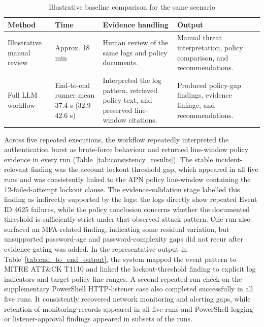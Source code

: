 \documentclass[conference]{IEEEtran}
\begin{document}
\begin{table}[t]
\centering
\caption{Illustrative baseline comparison for the same scenario}
\scriptsize
\setlength{\tabcolsep}{3pt}
\begin{tabular}{|p{}|p{}|p{}|p{}|}
\hline
\textbf{Method} & \textbf{Time} & \textbf{Evidence handling} & \textbf{Output} \\
\hline
Illustrative manual review & Approx. 18 min & Human review of the same logs and policy documents. & Manual threat interpretation, policy comparison, and recommendations. \\
\hline
Full LLM workflow & End-to-end runner mean 37.4 s (32.9--42.6 s) & Interpreted the log pattern, retrieved policy text, and preserved line-window citations. & Produced policy-gap findings, evidence linkage, and recommendations. \\
\hline
\end{tabular}
\label{tab:baseline_comparison}
\end{table}

Across five repeated executions, the workflow repeatedly interpreted the authentication burst as brute-force behaviour and returned line-window policy evidence in every run (Table~\ref{tab:consistency_results}). The stable incident-relevant finding was the account lockout threshold gap, which appeared in all five runs and was consistently linked to the APN policy line-window containing the 12-failed-attempt lockout clause. The evidence-validation stage labelled this finding as indirectly supported by the logs: the logs directly show repeated Event ID 4625 failures, while the policy conclusion concerns whether the documented threshold is sufficiently strict under that observed attack pattern. One run also surfaced an MFA-related finding, indicating some residual variation, but unsupported password-age and password-complexity gaps did not recur after evidence-gating was added. In the representative output in Table~\ref{tab:end_to_end_output}, the system mapped the event pattern to MITRE ATT\&CK T1110 and linked the lockout-threshold finding to explicit log indicators and target-policy line ranges. A second repeated-run check on the supplementary PowerShell HTTP-listener case also completed successfully in all five runs. It consistently recovered network monitoring and alerting gaps, while retention-of-monitoring-records appeared in all five runs and PowerShell logging or listener-approval findings appeared in subsets of the runs.
\end{document}
